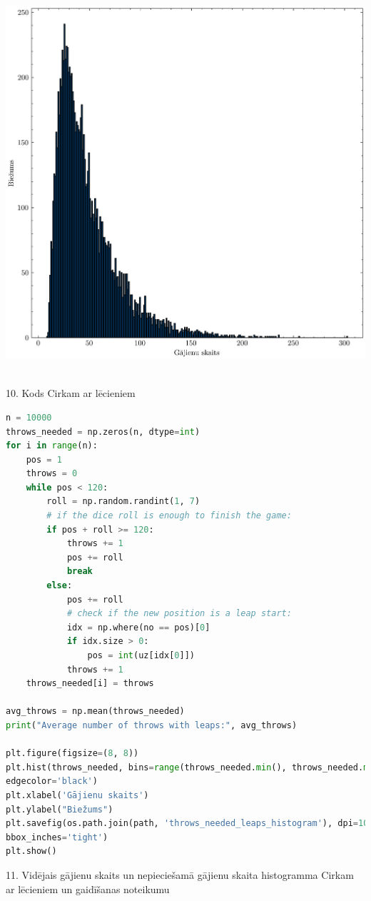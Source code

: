 \documentclass[12pt]{article}
\begin{document}
\begin{center}
    \includegraphics[width=0.8\linewidth]{throws_needed_leaps_histogram.png}
\end{center}

\\

10. Kods Cirkam ar lēcieniem

\begin{lstlisting}[language=Python]
n = 10000
throws_needed = np.zeros(n, dtype=int)
for i in range(n):
    pos = 1
    throws = 0
    while pos < 120:
        roll = np.random.randint(1, 7)
        # if the dice roll is enough to finish the game:
        if pos + roll >= 120:
            throws += 1
            pos += roll
            break
        else:
            pos += roll
            # check if the new position is a leap start:
            idx = np.where(no == pos)[0]
            if idx.size > 0:
                pos = int(uz[idx[0]])
            throws += 1
    throws_needed[i] = throws

avg_throws = np.mean(throws_needed)
print("Average number of throws with leaps:", avg_throws)

plt.figure(figsize=(8, 8))
plt.hist(throws_needed, bins=range(throws_needed.min(), throws_needed.max()+2),
edgecolor='black')
plt.xlabel('Gājienu skaits')
plt.ylabel("Biežums")
plt.savefig(os.path.join(path, 'throws_needed_leaps_histogram'), dpi=1000,
bbox_inches='tight')
plt.show()
\end{lstlisting}

11. Vidējais gājienu skaits un nepieciešamā gājienu skaita histogramma Cirkam ar lēcieniem un gaidīšanas noteikumu
\end{document}
